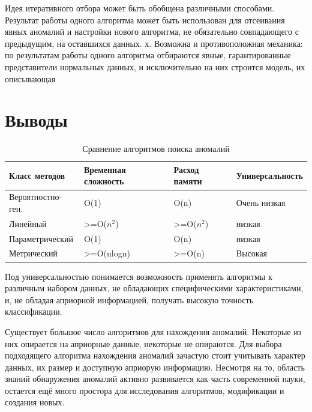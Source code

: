 Идея итеративного отбора может быть обобщена различными способами. Результат работы одного алгоритма может быть использован для отсеивания явных аномалий и настройки нового алгоритма, не обязательно совпадающего с предыдущим, на оставшихся данных. х. Возможна и противоположная механика: по результатам работы одного алгоритма отбираются явные, гарантированные
представители нормальных данных, и исключительно на них строится модель,
их описывающая
\section{Выводы}

\begin{table}[!h]
	
	\caption{\label{tab:collectdata}Сравнение алгоритмов поиска аномалий}
	
	\begin{center}
		
		\begin{tabular}{|l|l|l|l|}
			
			\hline
			
			Класс методов & Временная сложность & Расход памяти & Универсальность \\
			
			\hline \hline
			
			Вероятностно-ген.& O(1) &  O(n) & Очень низкая \\
			
			
			\hline
			
			Линейный &  >=O($n^2$) &  >=O($n^2$) & низкая\\
			
			
			\hline
			Параметрический & O(1) & O(n) & низкая\\
			\hline
			Метрический & >=O(nlogn) & >=O(n) & Высокая\\
			
			
			\hline
			
			
		\end{tabular}
		
	\end{center}
	
\end{table}                               
Под универсальностью понимается возможность применять алгоритмы к различным набором данных, не обладающих специфическими характеристиками, и, не обладая априорной информацией, получать высокую точность классификации.

Существует большое число алгоритмов для нахождения аномалий. Некоторые из них опирается на априорные данные, некоторые не опираются. Для выбора подходящего алгоритма нахождения аномалий зачастую стоит учитывать характер данных, их размер и доступную априорую информацию. Несмотря на то, область знаний обнаружения аномалий активно развивается как часть современной науки, остается ещё много простора для исследования алгоритмов, модификации и создания новых.


